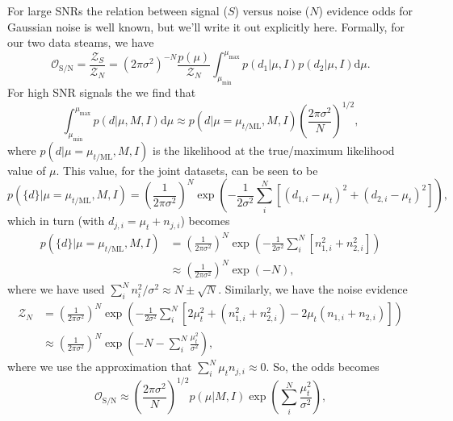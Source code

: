 For large SNRs the relation between signal ($S$) versus noise ($N$) evidence odds for Gaussian noise is well known, but we'll write it out explicitly here.
Formally, for our two data steams, we have
\begin{equation}
 \mathcal{O}_{\text{S}/\text{N}} = \frac{\mathcal{Z}_{S}}{\mathcal{Z}_{N}} = (2\pi\sigma^2)^{-N} \frac{p(\mu)}{\mathcal{Z}_{N}} \int_{\mu_{\text{min}}}^{\mu_{\text{max}}} p(d_1|\mu,I) p(d_2|\mu,I) {\text{d}\mu}.
\end{equation}
For high SNR signals the we find that
\begin{equation}
\int_{\mu_{\text{min}}}^{\mu_{\text{max}}} p(d|\mu,M,I) \text{d}\mu \approx p(d|\mu=\mu_{t/\text{ML}},M,I) \left(\frac{2\pi\sigma^2}{N} \right)^{1/2},
\end{equation}
where $p(d|\mu=\mu_{t/\text{ML}},M,I)$ is the likelihood at the true/maximum likelihood value of $\mu$. This value, for the joint datasets, can be seen to be
\begin{equation}
p(\{d\}|\mu=\mu_{t/\text{ML}},M,I) = \left(\frac{1}{2\pi\sigma^2}\right)^{N} \exp{\left(-\frac{1}{2\sigma^2}\sum_i^N \left[(d_{1,i} - \mu_t)^2 + (d_{2,i} - \mu_t)^2 \right]\right)},
\end{equation}
which in turn (with $d_{j,i} = \mu_t + n_{j,i}$) becomes
\begin{align}
p(\{d\}|\mu=\mu_{t/\text{ML}}, M, I) &= \left(\frac{1}{2\pi\sigma^2}\right)^{N} \exp{\left(-\frac{1}{2\sigma^2}\sum_i^N \left[ n_{1,i}^2 + n_{2,i}^2 \right]\right)} \nonumber \\
&\approx \left(\frac{1}{2\pi\sigma^2}\right)^{N} \exp{(-N)},
\end{align}
where we have used $\sum_i^N n_i^2/\sigma^2 \approx N \pm \sqrt{N}$. Similarly, we have the noise evidence
\begin{align}
\mathcal{Z}_N &= \left(\frac{1}{2\pi\sigma^2}\right)^{N} \exp{\left(-\frac{1}{2\sigma^2}\sum_i^N \left[2\mu_t^2 + (n_{1,i}^2 + n_{2,i}^2) - 2\mu_t(n_{1,i} + n_{2,i}) \right] \right)} \nonumber \\
&\approx 
\left(\frac{1}{2\pi\sigma^2}\right)^{N}\exp{\left(-N - \sum_i^N \frac{\mu_t^2}{\sigma^2} \right)},
\end{align}
where we use the approximation that $\sum_i^N \mu_t n_{j,i} \approx 0$. So, the odds becomes
\begin{equation}
\mathcal{O}_{\text{S}/\text{N}} \approx \left(\frac{2\pi\sigma^2}{N} \right)^{1/2}p(\mu|M,I)\exp{\left(\sum_i^N \frac{\mu_t^2}{\sigma^2}\right)},
\end{equation}
